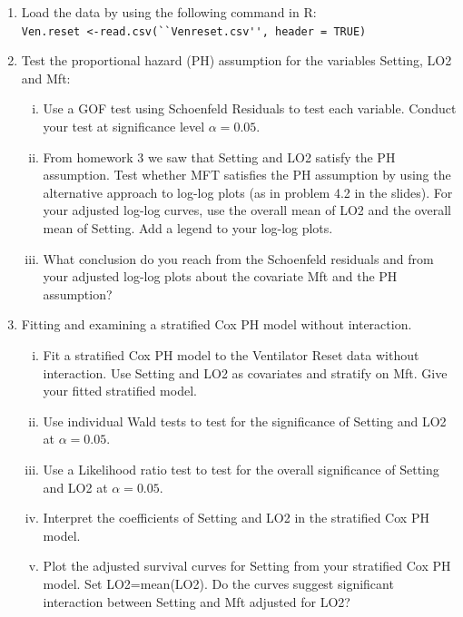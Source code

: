 \documentclass[12pt]{article}
\begin{document}
\begin{enumerate}[1.]
\item Load the data by using the following command in R: \\
 \lstinline{Ven.reset <-read.csv(``Venreset.csv'', header = TRUE)}

\item Test the proportional hazard (PH) assumption for the variables Setting, LO2 and Mft:
\begin{enumerate}[i.]
\item Use a GOF test using Schoenfeld Residuals to test each variable. Conduct your test at significance level $\alpha=0.05$.
\item From homework 3 we saw that Setting and LO2 satisfy the PH assumption.  Test whether MFT satisfies the PH assumption by using the alternative approach to log-log plots (as in problem 4.2 in the slides). For your adjusted log-log curves, use the overall mean of LO2 and the overall mean of Setting. Add a legend to your log-log plots.
\item What conclusion do you reach from the Schoenfeld residuals and from your adjusted log-log plots about the covariate Mft and the PH assumption?
\end{enumerate}
\item Fitting and examining a stratified Cox PH model without interaction.
\begin{enumerate}[i.]
\item Fit a stratified Cox PH model to the Ventilator Reset data without interaction. Use Setting and LO2 as covariates and stratify on Mft. Give your fitted stratified model.
\item Use individual Wald tests to test for the significance of Setting and LO2 at $\alpha=0.05$.
\item Use a Likelihood ratio test to test for the overall significance of Setting and LO2 at $\alpha=0.05$.
\item Interpret the coefficients of Setting and LO2 in the stratified Cox PH model.
\item Plot the adjusted survival curves for Setting from your stratified Cox PH model. Set LO2=mean(LO2). Do the curves suggest significant interaction between Setting and Mft adjusted for LO2?
\end{enumerate}
\vspace{30pt}


\end{enumerate}
\end{document}
